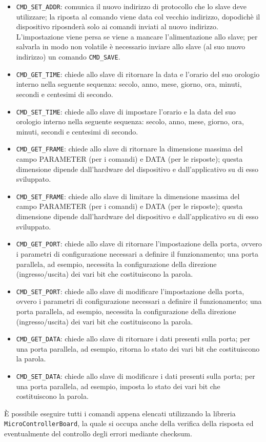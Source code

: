 \begin{itemize}
\item \texttt{CMD\_SET\_ADDR}: comunica il nuovo indirizzo di protocollo che lo slave deve utilizzare; la riposta al comando
viene data col vecchio indirizzo, dopodich\`e il dispositivo riposnder\`a solo ai comandi inviati al nuovo indirizzo. 
L'impostazione viene persa se viene a mancare l'alimentazione allo slave; per salvarla in modo non volatile \`e 
necessario inviare allo slave (al suo nuovo indirizzo) un comando \texttt{CMD\_SAVE}.
\item \texttt{CMD\_GET\_TIME}: chiede allo slave di ritornare la data e l'orario del suo orologio interno nella seguente
sequenza: secolo, anno, mese, giorno, ora, minuti, secondi e centesimi di secondo.
\item \texttt{CMD\_SET\_TIME}: chiede allo slave di impostare l'orario e la data del suo orologio interno nella seguente
sequenza: secolo, anno, mese, giorno, ora, minuti, secondi e centesimi di secondo.
\item \texttt{CMD\_GET\_FRAME}: chiede allo slave di ritornare la dimensione massima del campo PARAMETER (per i comandi)
e DATA (per le risposte); questa dimensione dipende dall'hardware del dispositivo e dall'applicativo su di esso
sviluppato.
\item \texttt{CMD\_SET\_FRAME}: chiede allo slave di limitare la dimensione massima del campo PARAMETER (per i comandi)
e DATA (per le risposte); questa dimensione dipende dall'hardware del dispositivo e dall'applicativo su di esso sviluppato.
\item \texttt{CMD\_GET\_PORT}: chiede allo slave di ritornare l'impostazione della porta, ovvero i parametri di configurazione
necessari a definire il funzionamento; una porta parallela, ad esempio, necessita la configurazione della direzione 
(ingresso/uscita) dei vari bit che costituiscono la parola.
\item \texttt{CMD\_SET\_PORT}: chiede allo slave di modificare l'impostazione della porta, ovvero i parametri di configurazione
necessari a definire il funzionamento; una porta parallela, ad esempio, necessita la configurazione della direzione 
(ingresso/uscita) dei vari bit che costituiscono la parola.
\item \texttt{CMD\_GET\_DATA}: chiede allo slave di ritornare i dati presenti sulla porta; per una porta parallela, ad esempio,
ritorna lo stato dei vari bit che costituiscono la parola.
\item \texttt{CMD\_SET\_DATA}:  chiede allo slave di modificare i dati presenti sulla porta; per una porta parallela, ad esempio,
imposta lo stato dei vari bit che costituiscono la parola.
\end{itemize}
\`E possibile eseguire tutti i comandi appena elencati utilizzando la libreria \texttt{MicroControllerBoard}, la quale si occupa
anche della verifica della risposta ed eventualmente del controllo degli errori mediante checksum.

